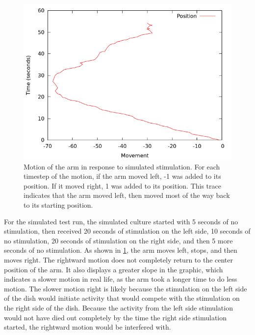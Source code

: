 \documentclass[letterpaper]{article}
\begin{document}
\begin{figure}
	\centering
	\includegraphics[width=\linewidth]{simulated_motion.png}
	\caption{Motion of the arm in response to simulated stimulation. 
	For each timestep of the motion, if the arm moved left, -1 was added to its position. If it moved right, 1 was added to its position. 
	This trace indicates that the arm moved left, then moved most of the way back to its starting position.}
	\label{fig:motion_sim}
\end{figure}

For the simulated test run, the simulated culture started with 5 seconds of no stimulation, then received 20 seconds of stimulation on the left side, 10 seconds of no stimulation, 20 seconds of stimulation on the right side, and then 5 more seconds of no stimulation. 
As shown in \ref{fig:motion_sim}, the arm moves left, stops, and then moves right. 
The rightward motion does not completely return to the center position of the arm. 
It also displays a greater slope in the graphic, which indicates a slower motion in real life, as the arm took a longer time to do less motion.
The slower motion right is likely because the stimulation on the left side of the dish would initiate activity that would compete with the stimulation on the right side of the dish.
Because the activity from the left side stimulation would not have died out completely by the time the right side stimulation started, the rightward motion would be interfered with. 
\end{document}
